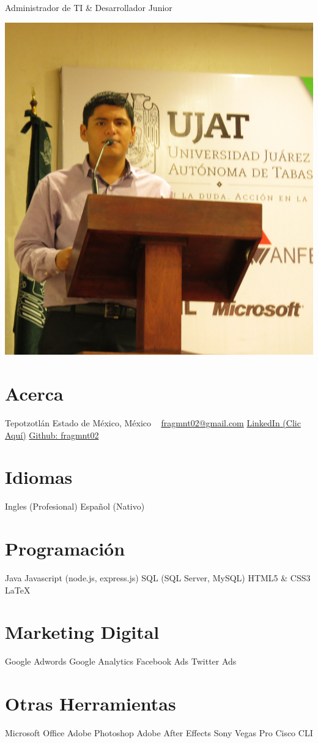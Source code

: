 \documentclass[]{friggeri-cv}
\begin{document}
       {Administrador de TI \& Desarrollador Junior}
\begin{aside}
  \includegraphics[scale=0.08]{yo}
  \section{Acerca}
    Tepotzotlán
    Estado de México,
    México
    ~
    \href{mailto:fragmnt02@gmail.com}{fragmnt02@gmail.com}
    \href{https://www.linkedin.com/in/franciscorafaelarcegarcia}{LinkedIn (Clic Aquí)}
    \href{https://github.com/fragmnt02}{Github: fragmnt02}
  \section{Idiomas}
    Ingles (Profesional)
    Español (Nativo)
  \section{Programación}
    Java
    Javascript
    (node.js, express.js)
    SQL
    (SQL Server, MySQL)
    HTML5 \& CSS3
    LaTeX
  \section{Marketing Digital}
    Google Adwords
    Google Analytics
    Facebook Ads
    Twitter Ads
  \section{Otras Herramientas}
    Microsoft Office
    Adobe Photoshop
    Adobe After Effects
    Sony Vegas Pro
    Cisco CLI
\end{aside}
\end{document}
